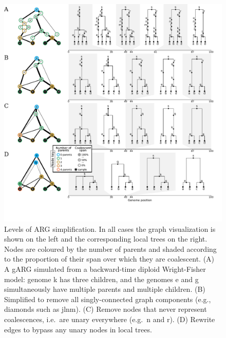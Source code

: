 \documentclass{article}
\newcommand{\noderef}[1]{\textsf{#1}}
\begin{document}
\begin{figure}
\centering
\includegraphics[width=\textwidth]{illustrations/simplification}
\caption{\label{fig-simplification}
Levels of ARG simplification.
In all cases the graph visualization is shown on the left
and the corresponding local trees on the right.
Nodes are coloured by the number of parents and shaded
according to the proportion of their span over which they are coalescent.
(A) A gARG simulated from a backward-time diploid Wright-Fisher
model: genome \noderef{k} has three children, and the genomes
\noderef{e} and \noderef{g} simultaneously have multiple parents and multiple children.
(B) Simplified to remove all
singly-connected graph components (e.g., diamonds such as \noderef{jlnm}).
(C) Remove nodes that never represent coalescences,
i.e.\ are unary everywhere (e.g.\ \noderef{n} and \noderef{r}).
(D) Rewrite edges to bypass any unary nodes in local trees.
}
\end{figure}
\end{document}
